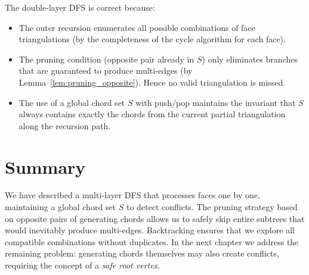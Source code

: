 The double-layer DFS is correct because:
\begin{itemize}
    \item The outer recursion enumerates all possible combinations of face triangulations (by the completeness of the cycle algorithm for each face).
    \item The pruning condition (opposite pair already in \(S\)) only eliminates branches that are guaranteed to produce multi-edges (by Lemma~\ref{lem:pruning_opposite}). 
    Hence no valid triangulation is missed.
    \item The use of a global chord set \(S\) with push/pop maintains the invariant that \(S\) always contains exactly the chords from the current partial triangulation along the recursion path.
\end{itemize}

\section{Summary}
\label{sec:multilayer_summary}

We have described a multi-layer DFS that processes faces one by one, maintaining a global chord set \(S\) to detect conflicts. 
The pruning strategy based on opposite pairs of generating chords allows us to safely skip entire subtrees that would inevitably produce multi-edges. 
Backtracking ensures that we explore all compatible combinations without duplicates. 
In the next chapter we address the remaining problem: generating chords themselves may also create conflicts, requiring the concept of a \emph{safe root vertex}.